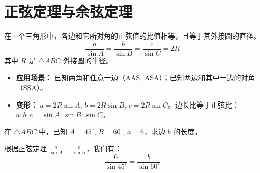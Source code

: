 \section{正弦定理与余弦定理}

\begin{theorem}[正弦定理]
    在一个三角形中，各边和它所对角的正弦值的比值相等，且等于其外接圆的直径。
    $$
        \frac{a}{\sin A} = \frac{b}{\sin B} = \frac{c}{\sin C} = 2R
    $$
    其中 $R$ 是 $\triangle ABC$ 外接圆的半径。
    \begin{itemize}
        \item \textbf{应用场景：} 已知两角和任意一边（AAS, ASA）；已知两边和其中一边的对角（SSA）。
        \item \textbf{变形：} $a = 2R \sin A$, $b = 2R \sin B$, $c = 2R \sin C$。边长比等于正弦比：$a:b:c = \sin A : \sin B : \sin C$。
    \end{itemize}
\end{theorem}

\begin{example}
    在 $\triangle ABC$ 中，已知 $A=45^\circ$, $B=60^\circ$, $a=6$，求边 $b$ 的长度。
\end{example}
\begin{solution}
    根据正弦定理 $\frac{a}{\sin A} = \frac{b}{\sin B}$，我们有：
    $$
        \frac{6}{\sin 45^\circ} = \frac{b}{\sin 60^\circ}
    $$
\end{solution}

